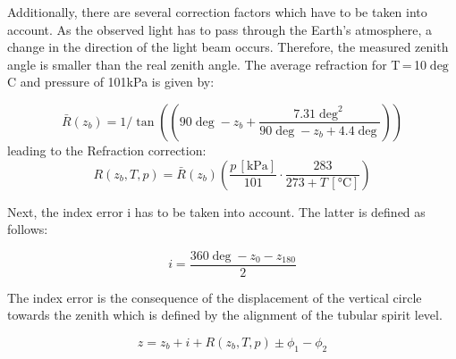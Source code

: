Additionally, there are several correction factors which have to be taken into account. As the observed light has to pass through the Earth's atmosphere, a change in the direction of the light beam occurs. Therefore, the measured zenith angle is smaller than the real zenith angle. The average refraction for T\,=\,10$\deg$C and pressure of 101kPa is given by:

\begin{equation}
    \bar{R}(z_b) = 1/\tan((90 \deg - z_b + \frac{7.31 \deg^2}{90\deg - z_b + 4.4 \deg}))
\end{equation}
 leading to the Refraction correction: 
\begin{equation}
    R(z_b, T, p) = \bar{R}(z_b) \left( \frac{p\, [\si{\kPa}]}{101} \cdot \frac{283}{273 + T\, [\si{\celsius}]} \right)
\end{equation}

Next, the index error i has to be taken into account. The latter is defined as follows:

\begin{equation}
    i = \frac{360 \deg - z_0 - z_{180}}{2}
\end{equation}

The index error is the consequence of the displacement of the
vertical circle towards the zenith which is defined by the alignment of
the tubular spirit level.

\begin{equation}
    \boxed{
        z = z_b + i + R(z_b, T, p) \pm \phi_1
- \phi_2    }
\end{equation}